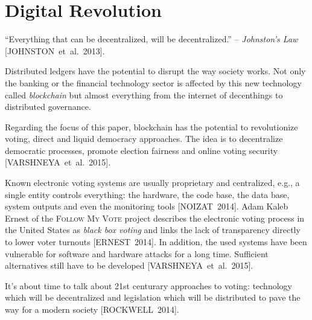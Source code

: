 
\section{Digital Revolution}\label{sec:motivation}


\enquote{Everything that can be decentralized, will be decentralized.} -- \textit{Johnston's Law} [JOHNSTON~et~al.~2013].\par
Distributed ledgers have the potential to disrupt the way society works. Not only the banking or the financial technology sector is affected by this new technology called \textit{blockchain} but almost everything from the internet of decenthings to distributed governance.\par
Regarding the focus of this paper, blockchain has the potential to revolutionize voting, direct and liquid democracy approaches. The idea is to decentralize democratic processes, promote election fairness and online voting security [VARSHNEYA~et~al.~2015].\par
Known electronic voting systems are usually proprietary and centralized, e.g., a single entity controls everything: the hardware, the code base, the data base, system outputs and even the monitoring tools [NOIZAT~2014]. Adam Kaleb Ernest of the \textsc{Follow My Vote} project describes the electronic voting process in the United States as \textit{black box voting} and links the lack of transparency directly to lower voter turnouts [ERNEST~2014]. In addition, the used systems have been vulnerable for software and hardware attacks for a long time. Sufficient alternatives still have to be developed [VARSHNEYA~et~al.~2015].\par
It's about time to talk about 21st centurary approaches to voting: technology which will be decentralized and legislation which will be distributed to pave the way for a modern society [ROCKWELL~2014].
